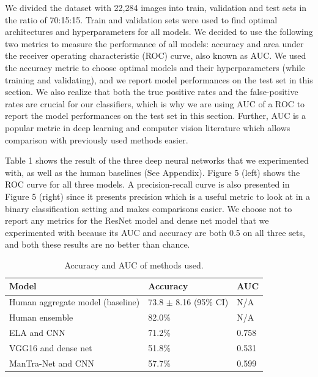 \documentclass[11pt]{article}
\begin{document}
We divided the dataset with 22,284 images into train, validation and test sets in the ratio of 70:15:15. Train and validation sets were used to find optimal architectures and hyperparameters for all models. We decided to use the following two metrics to measure the performance of all models: accuracy and area under the receiver operating characteristic (ROC) curve, also known as AUC. We used the accuracy metric to choose optimal models and their hyperparameters (while training and validating), and we report model performances on the test set in this section. We also realize that both the true positive rates and the false-positive rates are crucial for our classifiers, which is why we are using AUC of a ROC to report the model performances on the test set in this section. Further, AUC is a popular metric in deep learning and computer vision literature which allows comparison with previously used methods easier.

Table 1 shows the result of the three deep neural networks that we experimented with, as well as the human baselines (See Appendix). Figure 5 (left) shows the ROC curve for all three models. A precision-recall curve is also presented in Figure 5 (right) since it presents precision which is a useful metric to look at in a binary classification setting and makes comparisons easier. We choose not to report any metrics for the ResNet model and dense net model that we experimented with because its AUC and accuracy are both 0.5 on all three sets, and both these results are no better than chance.

\begin{table}[!htb]
    \centering
    \begin{tabular}{|l|l|l|}
    \hline
        \textbf{Model} & \textbf{Accuracy} & \textbf{AUC}\\ \hline
        Human aggregate model (baseline) & 73.8 $\pm$ 8.16 (95\% CI) & N/A \\ \hline
        Human ensemble & 82.0\% & N/A \\ \hline
        ELA and CNN & 71.2\% & 0.758 \\ \hline
        VGG16 and dense net & 51.8\% & 0.531 \\ \hline
        ManTra-Net and CNN & 57.7\% & 0.599 \\ \hline
    \end{tabular}
\caption{Accuracy and AUC of methods used.}
\end{table}
\end{document}
